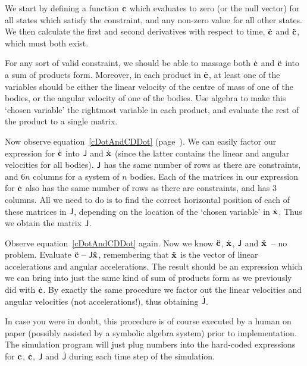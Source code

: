 We start by defining a function $\ve{c}$ which evaluates to zero (or the null vector) for
all states which satisfy the constraint, and any non-zero value for all other states.
We then calculate the first and second derivatives with respect to time, $\dot{\ve{c}}$
and $\ddot{\ve{c}}$, which must both exist.

For any sort of valid constraint, we should be able to massage both $\dot{\ve{c}}$ and
$\ddot{\ve{c}}$ into a sum of products form. Moreover, in each product in
$\dot{\ve{c}}$, at least one of the variables should be either the linear velocity of
the centre of mass of one of the bodies, or the angular velocity of one of the bodies.
Use algebra to make this `chosen variable' the rightmost variable in each product, and
evaluate the rest of the product to a single matrix.

Now observe equation~\ref{cDotAndCDDot} (page~\pageref{cDotAndCDDot}). We can easily
factor our expression for
$\dot{\ve{c}}$ into $\mathsf{J}$ and $\dot{\ve{x}}$ (since the latter contains
the linear and angular velocities for all bodies). $\mathsf{J}$ has the same number of rows
as there are constraints, and $6n$ columns for a system of $n$ bodies. Each of the matrices
in our expression for $\dot{\ve{c}}$ also has the same number of rows as there are
constraints, and has 3 columns. All we need to do is to find the correct horizontal position
of each of these matrices in $\mathsf{J}$, depending on the location of the `chosen variable'
in $\dot{\ve{x}}$. Thus we obtain the matrix $\mathsf{J}$.

Observe equation~\ref{cDotAndCDDot} again. Now we know $\ddot{\ve{c}}$, $\dot{\ve{x}}$,
$\mathsf{J}$ and $\ddot{\ve{x}}$~-- no problem. Evaluate
$\ddot{\ve{c}} - \m{J}\ddot{\ve{x}}$, remembering that $\ddot{\ve{x}}$ is
the vector of linear accelerations and angular accelerations. The result should be an
expression which we can bring into just the same kind of sum of products form as we previously
did with $\dot{\ve{c}}$. By exactly the same procedure we factor out the linear velocities
and angular velocities (not accelerations!), thus obtaining $\dot{\mathsf{J}}$.

In case you were in doubt, this procedure is of course executed by a human on paper
(possibly assisted by a symbolic algebra system) prior to
implementation. The simulation program will just plug numbers into the hard-coded expressions
for $\ve{c}$, $\dot{\ve{c}}$, $\mathsf{J}$ and $\dot{\mathsf{J}}$ during each time step
of the simulation.
